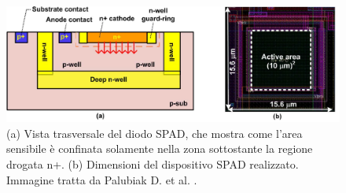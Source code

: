 \begin{figure}[tbh]
	\centering
	\includegraphics[width=0.8\linewidth]{./ImageFiles/cmos_2.jpg}
	\caption{(a) Vista trasversale del diodo SPAD, che mostra come l'area sensibile è confinata solamente nella zona sottostante la regione drogata n+. (b) Dimensioni del dispositivo SPAD realizzato. Immagine tratta da Palubiak D. et al. \cite{Palubiak2011}.} 
	\label{fig:cmos_2}
\end{figure} 

